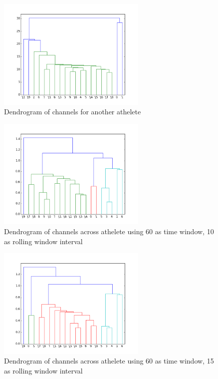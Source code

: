\begin{figure}
    \centering
    \includegraphics[width=2.8in]{figure/single2.png}
    \caption{Dendrogram of channels for another athelete}
    \label{athelet_dendrogram2}
\end{figure}
\begin{figure}
    \centering
    \includegraphics[width=2.8in]{figure/all1.png}
    \caption{Dendrogram of channels across athelete using 60 as time window, 10 as rolling window interval}
    \label{allathelet_dendrogram1}
\end{figure}
\begin{figure}
    \centering
    \includegraphics[width=2.8in]{figure/all2.png}
    \caption{Dendrogram of channels across athelete using 60 as time window, 15 as rolling window interval}
    \label{allathelet_dendrogram2}
\end{figure}